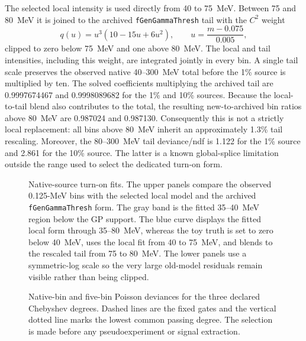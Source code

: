 The selected local intensity is used directly from 40 to 75~MeV.  Between
75 and 80~MeV it is joined to the archived \texttt{fGenGammaThresh} tail with
the $C^2$ weight
\begin{equation}
 q(u)=u^3(10-15u+6u^2),\qquad
 u=\frac{m-0.075}{0.005},
\end{equation}
clipped to zero below 75~MeV and one above 80~MeV.  The local and tail
intensities, including this weight, are integrated jointly in every bin.  A
single tail scale preserves the observed native 40--300~MeV total before the
1\% source is multiplied by ten.  The solved coefficients multiplying the
archived tail are 0.9997674467 and 0.9998089682 for the 1\% and 10\%
sources.  Because the local-to-tail blend also contributes to the total, the
resulting new-to-archived bin ratios above 80~MeV are 0.987024 and 0.987130.
Consequently this is not a strictly local replacement: all bins above 80~MeV
inherit an approximately 1.3\% tail rescaling.  Moreover, the 80--300~MeV
tail deviance/ndf is 1.122 for the 1\% source and 2.861 for the 10\% source.
The latter is a known global-splice limitation outside the range used to
select the dedicated turn-on form.

\begin{figure}[p]
\centering
{}
\caption{Native-source turn-on fits.  The upper panels compare the observed
0.125-MeV bins with the selected local model and the archived
\texttt{fGenGammaThresh} form.  The gray band is the fitted 35--40~MeV region
below the GP support.  The blue curve displays the fitted local form through
35--80~MeV, whereas the toy truth is set to zero below 40~MeV, uses the local
fit from 40 to 75~MeV, and blends to the rescaled tail from 75 to 80~MeV.
The lower panels use a symmetric-log scale so the very large old-model
residuals remain visible rather than being clipped.}
\label{fig:v4p7-near-threshold-source-fits}
\end{figure}

\begin{figure}[htbp]
\centering
{}
\caption{Native-bin and five-bin Poisson deviances for the three declared
Chebyshev degrees.  Dashed lines are the fixed gates and the vertical dotted
line marks the lowest common passing degree.  The selection is made before
any pseudoexperiment or signal extraction.}
\label{fig:v4p7-near-threshold-degree-selection}
\end{figure}


